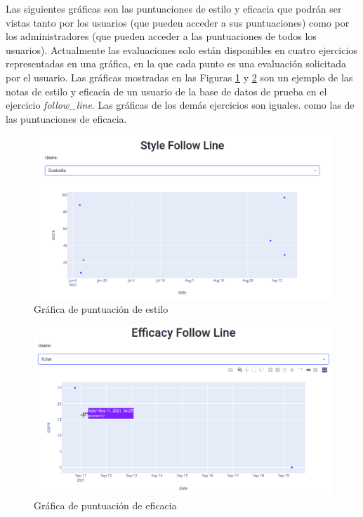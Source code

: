 Las siguientes gráficas son las puntuaciones de estilo y eficacia que podrán ser vistas tanto por los usuarios (que pueden acceder a sus puntuaciones) como por los administradores (que pueden acceder a las puntuaciones de todos los usuarios).  Actualmente las evaluaciones solo están disponibles en cuatro ejercicios representadas en una gráfica, en la que cada punto es una evaluación solicitada por el usuario. Las gráficas mostradas en las Figuras \ref{fig:score} y \ref{fig:score_efficacy}  son un ejemplo de las notas de estilo y eficacia de un usuario de la base de datos de prueba en el ejercicio \textit{follow\_line}. Las gráficas de los demás ejercicios son iguales. como las de las puntuaciones de eficacia.



\begin{figure}[H]
    \centering
    \includegraphics[width=17cm, keepaspectratio]{img/score.png}
    \caption{Gráfica de puntuación de estilo}
    \label{fig:score}
\end{figure}


\begin{figure}[H]
    \centering
    \includegraphics[width=17cm, keepaspectratio]{img/score_efficacy.png}
    \caption{Gráfica de puntuación de eficacia}
    \label{fig:score_efficacy}
\end{figure}









